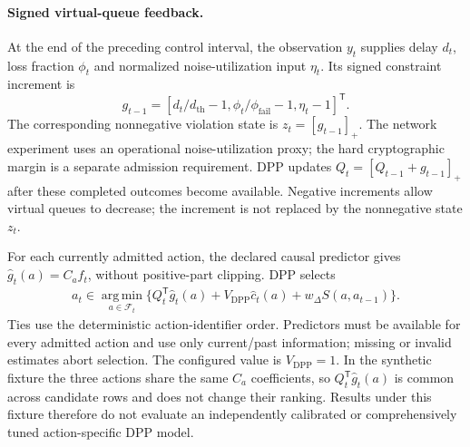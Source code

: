 \paragraph{Signed virtual-queue feedback.}
At the end of the preceding control interval, the observation $y_t$ supplies
delay $d_t$, loss fraction $\phi_t$ and normalized noise-utilization input
$\eta_t$. Its signed constraint increment is
\begin{equation}
 g_{t-1}=\left[
    d_t/d_{\mathrm{th}}-1,
    \phi_t/\phi_{\mathrm{fail}}-1,
    \eta_t-1\right]^{\mathsf T}.
 \label{eq:baseline_signed_increment}
\end{equation}
The corresponding nonnegative violation state is $z_t=[g_{t-1}]_+$.
The network experiment uses an operational noise-utilization proxy; the hard
cryptographic margin is a separate admission requirement. DPP updates
$Q_t=[Q_{t-1}+g_{t-1}]_+$ after these completed outcomes become available.
Negative increments allow virtual queues to decrease; the increment is not
replaced by the nonnegative state $z_t$.

For each currently admitted action, the declared causal predictor gives
$\widehat{g}_t(a)=C_af_t$, without positive-part clipping. DPP selects
\begin{equation}
 \begin{aligned}
 a_t\in\underset{a\in\mathcal{F}_t}{\operatorname{arg\,min}}
 \bigl\{Q_t^{\mathsf T}\widehat{g}_t(a)
       +V_{\mathrm{DPP}}\widehat{c}_t(a)
       +w_{\Delta}S(a,a_{t-1})\bigr\}.
 \end{aligned}
 \label{eq:baseline_dpp_objective}
\end{equation}
Ties use the deterministic action-identifier order. Predictors must be available
for every admitted action and use only current/past information; missing or
invalid estimates abort selection. The configured value is $V_{\mathrm{DPP}}=1$.
In the synthetic fixture the three actions share the same $C_a$ coefficients,
so $Q_t^{\mathsf T}\widehat{g}_t(a)$ is common across candidate rows and does
not change their ranking. Results under this fixture therefore do not evaluate
an independently calibrated or comprehensively tuned action-specific DPP model.

